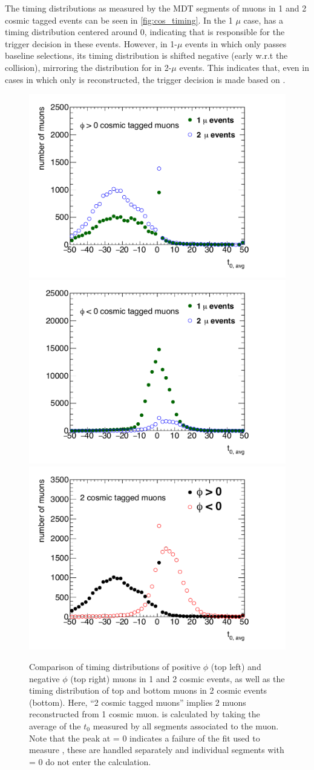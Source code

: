 The timing distributions as measured by the MDT segments of muons in 1 and 2 cosmic tagged events can be seen in \autoref{fig:cos_timing}. In the 1 $\mu$ case, \mb has a timing distribution centered around 0, indicating that \mb is responsible for the trigger decision in these events. However, in 1-$\mu$ events in which only \mt passes baseline selections, its timing distribution is shifted negative (early w.r.t the collision), mirroring the distribution for \mt in 2-$\mu$ events. This indicates that, even in cases in which only \mt is reconstructed, the trigger decision is made based on \mb. 

\begin{figure}[!ht]
\centering
\includegraphics[width=.48\textwidth]{figures/cosmics/t0_plusphi.pdf}
\includegraphics[width=.48\textwidth]{figures/cosmics/t0_negphi.pdf}
\includegraphics[width=.48\textwidth]{figures/cosmics/t0_2cos_plusminus.pdf}
\caption{Comparison of timing distributions of positive $\phi$ (top left) and negative $\phi$ (top right) muons in 1 and 2 cosmic events, as well as the timing distribution of top and bottom muons in 2 cosmic events (bottom). Here, ``2 cosmic tagged muons'' implies 2 muons reconstructed from 1 cosmic muon. \tavg is calculated by taking the average of the $t_{0}$ measured by all segments associated to the muon. Note that the peak at \tavg = 0 indicates a failure of the fit used to measure \tavg, these are handled separately and individual segments with \tavg = 0 do not enter the \tavg calculation.}
\label{fig:cos_timing}
\end{figure}

